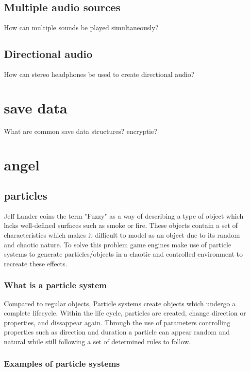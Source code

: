 \documentclass{article} %
\begin{document}
\subsection{Multiple audio sources}
How can multiple sounds be played simultaneously?
\subsection{Directional audio}
How can stereo headphones be used to create directional audio?
\section{save data}
What are common save data structures?
encryptie?
\newpage

\section{angel}
\subsection{particles}

Jeff Lander coins the term "Fuzzy" as a way of describing a type of object which lacks well-defined surfaces such as smoke or fire. \cite{Lander_1998} These objects contain a set of characteristics which makes it difficult to model as an object due to its random and chaotic nature. To solve this problem game engines make use of particle systems to generate particles/objects in a chaotic and controlled environment to recreate these effects.

\subsubsection{What is a particle system}

Compared to regular objects, Particle systems create objects which undergo a complete lifecycle. Within the life cycle, particles are created, change direction or properties, and dissappear again. Through the use of parameters controlling properties such as direction and duration a particle can appear random and natural while still following a set of determined rules to follow.

\subsubsection{Examples of particle systems}
\end{document}
